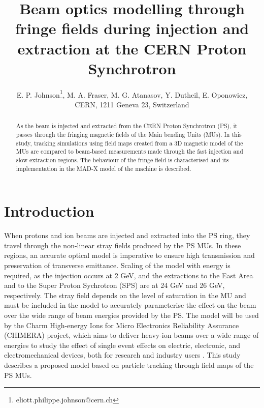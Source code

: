 \documentclass[a4paper,
               biblatex,     %
               keeplastbox,   %
               ]{jacow}
\begin{document}
\title{Beam optics modelling through fringe fields during injection and extraction at the CERN Proton Synchrotron}

\author{E. P. Johnson\thanks{eliott.philippe.johnson@cern.ch}, M. A. Fraser, M. G. Atanasov, Y. Dutheil, E. Oponowicz,\\ CERN, 1211 Geneva 23, Switzerland}
	
\maketitle

%
\begin{abstract}
As the beam is injected and extracted from the CERN Proton Synchrotron (PS), it passes through the fringing magnetic fields of the Main bending Units (MUs). In this study, tracking simulations using field maps created from a 3D magnetic model of the MUs are compared to beam-based measurements made through the fast injection and slow extraction regions. The behaviour of the fringe field is characterised and its implementation in the MAD-X \cite{noauthor_mad_nodate} model of the machine is described.
\end{abstract}


\section{Introduction}
When protons and ion beams are injected and extracted into the PS ring, they travel through the non-linear stray fields produced by the PS MUs. In these regions, an accurate optical model is imperative to ensure high transmission and preservation of transverse emittance. Scaling of the model with energy is required, as the injection occurs at 2 GeV, and the extractions to the East Area and to the Super Proton Sychrotron (SPS) are at 24 GeV and 26 GeV, respectively. The stray field depends on the level of saturation in the MU and must be included in the model to accurately parameterise the effect on the beam over the wide range of beam energies provided by the PS. The model will be used by the Charm High-energy Ions for Micro Electronics Reliability Assurance (CHIMERA) project, which aims to deliver heavy-ion beams over a wide range of energies to study the effect of single event effects on electric, electronic, and electromechanical devices, both for research and industry users \cite{fraser:ipac22-wepost012}. This study describes a proposed model based on particle tracking through field maps of the PS MUs.
\end{document}

